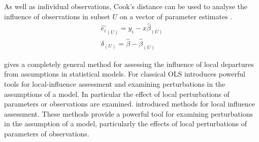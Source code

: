 \documentclass[12pt, a4paper]{report}
\theoremstyle{plain}
\theoremstyle{definition}
\theoremstyle{remark}
\begin{document}
As well as individual observations, Cook's distance can be used to analyse the influence of observations in subset $U$ on a vector of parameter estimates \citep{cook77}.
\begin{eqnarray}
\hat{e_{i}}_{(U)} = y_{i} - x\hat{\beta}_{(U)}\\
\delta_{(U)} = \hat{\beta} - \hat{\beta}_{(U)}
\end{eqnarray}





\citet{cook86} gives a completely general method for assessing the influence of local departures from assumptions in statistical models.
For classical OLS \citet{cook86} introduces powerful tools for local-influence assessment and examining perturbations in the assumptions of a model. In particular the effect of local perturbations of parameters or observations are examined.
\citet{cook86} introduced methods for local influence assessment. These methods provide a powerful tool for examining perturbations in the assumption of a model, particularly the effects of local perturbations of parameters of observations.





	



\end{document}
